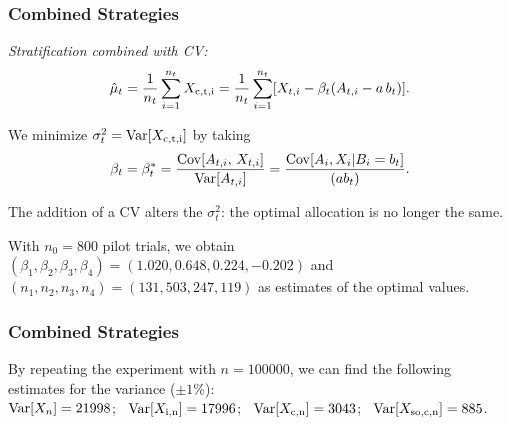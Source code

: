 \documentclass[t,usepdftitle=false,aspectratio=169]{beamer}
\begin{document}
\begin{frame}
	\frametitle{Combined Strategies}
	
	\emph{Stratification combined with CV:}\\
	$$ 
	{\hat\mu_t} = {1\over n_t} \sum_{i=1}^{n_t} X_{\rm{c},t,i} 
	= {1\over n_t} \sum_{i=1}^{n_t} 
	[X_{t,i} - \beta_t (A_{t,i} - a\,b_t)].
	$$
	
	\mbox{}
	
	We minimize \(\sigma_t^2 = \operatorname{Var}[X_{\rm{c},t,i}]\) by taking 
	\[
	\beta_t = {\beta_t^*} = \frac{\operatorname{Cov}[A_{t,i},\, X_{t,i}]}{\operatorname{Var}[A_{t,i}]}
	= \frac{\operatorname{Cov}[A_i, X_i | B_i=b_t]}{(a b_t)}.
	\]
	
	\mbox{}
	
	The addition of a CV alters the \(\sigma_t^2\): the optimal allocation 
	is no longer the same.
	
	\mbox{}
	
	With \(n_0=800\) pilot trials, we obtain
	\((\beta_1,\beta_2, \beta_3, \beta_4) = (1.020, 0.648, 0.224, -0.202)\) 
	and \((n_1, n_2, n_3, n_4) = (131, 503, 247, 119)\) 
	as estimates of the optimal values.
	
\end{frame}

\begin{frame}
	\frametitle{Combined Strategies}
	
	By repeating the experiment with \(n = 100000\), we can find the following estimates for the variance (\(\pm 1\%\)):\\
	$\operatorname{Var}[X_{n}] = 21998$; \
	$\operatorname{Var}[X_{\rm{i},n}] = 17996$; \
	$\operatorname{Var}[X_{\rm{c},n}] = 3043$; \
	$\operatorname{Var}[X_{\rm{s}o,\rm{c},n}] = 885$.
	
\end{frame}
\end{document}
